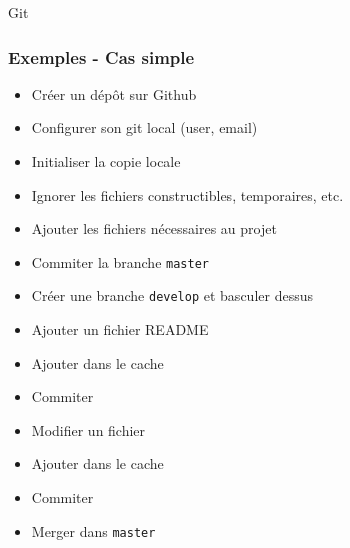 \begin{frame}[fragile]{Git}
 \frametitle{Exemples - Cas simple}
 \begin{itemize}[<+->]
  \item Créer un dépôt sur Github
  \item Configurer son git local (user, email)
  \item Initialiser la copie locale
  \item Ignorer les fichiers constructibles, temporaires, etc.
  \item Ajouter les fichiers nécessaires au projet
  \item Commiter la branche \verb/master/
  \item Créer une branche \verb/develop/ et basculer dessus
  \item Ajouter un fichier README
  \item Ajouter dans le cache
  \item Commiter
  \item Modifier un fichier
  \item Ajouter dans le cache
  \item Commiter
  \item Merger dans \verb/master/
 \end{itemize}

\end{frame}
